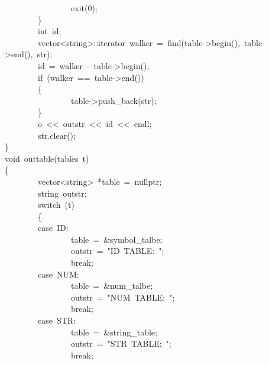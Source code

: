 \documentclass{article}
\begin{document}
\begin{mdpre}
~~~~~~~~~~~~~~~~exit({0});\\
~~~~~~~~\}\\
~~~~~~~~{int}~id;\\
~~~~~~~~vector\textless{}string\textgreater{}::iterator~walker~=~find(table-\textgreater{}begin(),~table-\textgreater{}end(),~str);\\
~~~~~~~~id~=~walker~-~table-\textgreater{}begin();\\
~~~~~~~~{if}~(walker~==~table-\textgreater{}end())\\
~~~~~~~~\{\\
~~~~~~~~~~~~~~~~table-\textgreater{}push\_back(str);\\
~~~~~~~~\}\\
~~~~~~~~o~\textless{}\textless{}~outstr~\textless{}\textless{}~id~\textless{}\textless{}~endl;\\
~~~~~~~~str.clear();\\
\}\\
{void}~outtable(tables~t)\\
\{\\
~~~~~~~~vector\textless{}string\textgreater{}~*table~=~{nullptr};\\
~~~~~~~~string~outstr;\\
~~~~~~~~{switch}~(t)\\
~~~~~~~~\{\\
~~~~~~~~{case}~{ID}:\\
~~~~~~~~~~~~~~~~table~=~\&symbol\_talbe;\\
~~~~~~~~~~~~~~~~outstr~=~{"}{ID~TABLE:~}{"};\\
~~~~~~~~~~~~~~~~{break};\\
~~~~~~~~{case}~{NUM}:\\
~~~~~~~~~~~~~~~~table~=~\&num\_talbe;\\
~~~~~~~~~~~~~~~~outstr~=~{"}{NUM~TABLE:~}{"};\\
~~~~~~~~~~~~~~~~{break};\\
~~~~~~~~{case}~{STR}:\\
~~~~~~~~~~~~~~~~table~=~\&string\_table;\\
~~~~~~~~~~~~~~~~outstr~=~{"}{STR~TABLE:~}{"};\\
~~~~~~~~~~~~~~~~{break};\\

\end{mdpre}
\end{document}
